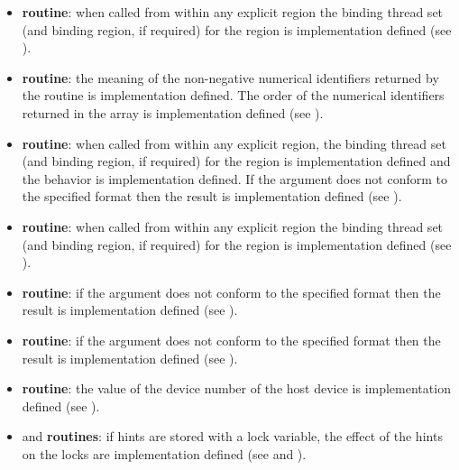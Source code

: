 \begin{itemize}
\item {} \textbf{routine}: when called from within any explicit
 region the binding thread set (and binding region, if required) for the
 region is implementation defined (see
).

\item {} \textbf{routine}: the meaning of the
non-negative numerical identifiers returned by the
 routine is implementation defined. The
order of the numerical identifiers returned in the array  is
implementation defined (see
).

\item {} \textbf{routine}: when called from within any explicit
 region, the binding thread set (and binding region, if required) for the
 region is implementation defined and the
behavior is implementation defined. If the argument does not
conform to the specified format then the result is implementation defined (see
).

\item {} \textbf{routine}: when called from within any explicit
 region the binding thread set (and binding region, if required) for the
 region is implementation defined (see
).

\item {} \textbf{routine}:  if the argument does not
conform to the specified format then the result is implementation defined (see
).

\item {} \textbf{routine}:  if the  argument does not
conform to the specified format then the result is implementation defined (see
).

\item {} \textbf{routine}: the value of
  the device number of the host device is implementation defined (see ).

\item {} and  \textbf{routines}:
if hints are stored with a lock variable, the effect of the hints on the locks are implementation defined
(see  and ).


\end{itemize}
